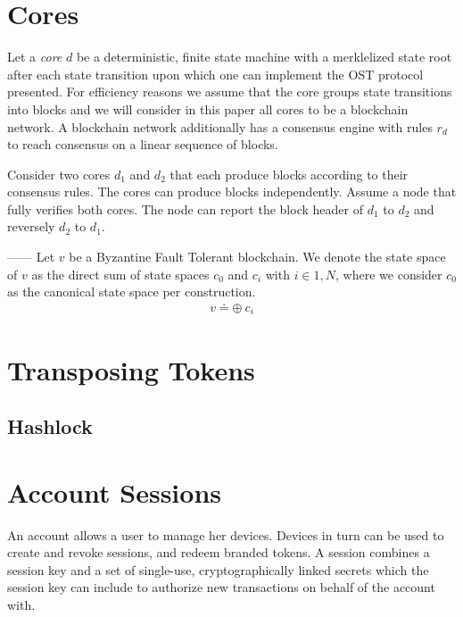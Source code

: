 \documentclass[12pt,a4paper, twocolumn]{article}
\begin{document}
\section{Cores}

Let a \emph{core} $d$ be a deterministic, finite state machine with a merklelized state root after each state transition upon which one can implement the OST protocol presented. For efficiency reasons we assume that the core groups state transitions into blocks and we will consider in this paper all cores to be a blockchain network.  A blockchain network additionally has a consensus engine with rules $r_d$ to reach consensus on a linear sequence of blocks.

Consider two cores $d_1$ and $d_2$ that each produce blocks according to their consensus rules.  The cores can produce blocks independently. Assume a node that fully verifies both cores.  The node can report the block header of $d_1$ to $d_2$ and reversely $d_2$ to $d_1$.

------
Let $v$ be a Byzantine Fault Tolerant blockchain. We denote the state space of $v$ as the direct sum of state spaces $c_0$ and $c_i$ with $i \in {1, N}$, where we consider $c_0$ as the canonical state space per construction. 
\begin{align}
	v \doteq \oplus \ c_i	
\end{align}


\section{Transposing Tokens}




\subsection{Hashlock}

\section{Account Sessions}

An account allows a user to manage her devices. Devices in turn
can be used to create and revoke sessions, and redeem branded
tokens.  A session combines a session key and a set of single-use,
cryptographically linked secrets which the session key can include
to authorize new transactions on behalf of the account with.
\end{document}
